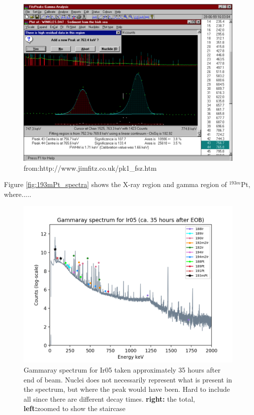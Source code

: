 \begin{figure}
    \centering
    \includegraphics[width=18cm]{Analysis/fitz_example.png}
    \caption{from:http://www.jimfitz.co.uk/pk1_fsz.htm}
    \label{fig:fitz_example}
\end{figure}

\noindent 
Figure \ref{fig:193mPt_spectra} shows the X-ray region and gamma region of $^{193m}$Pt, where..... 


\begin{figure}
    \centering
    \includegraphics{Analysis/gammaray_spec_Ir05.png}
    \caption{Gammaray spectrum for Ir05 taken approximately 35 hours after end of beam. Nuclei does not necessarily represent what is present in the spectrum, but where the peak would have been. Hard to include all since there are different decay times. \textbf{right:} the total, \textbf{left:}zoomed to show the staircase}
    \label{fig:gammarayspectrum_example}
\end{figure}


